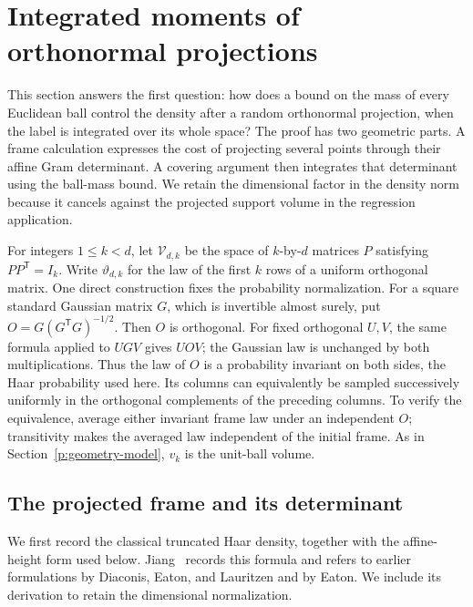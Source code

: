 \section{Integrated moments of orthonormal projections}
\label{p:projection}

This section answers the first question: how does a bound on the mass of
every Euclidean ball control the density after a random orthonormal
projection, when the label is integrated over its whole space? The proof
has two geometric parts. A frame calculation expresses the cost of
projecting several points through their affine Gram determinant. A covering
argument then integrates that determinant using the ball-mass bound.
We retain the dimensional factor in the density norm because it cancels
against the projected support volume in the regression application.

For integers \(1\le k<d\), let \(\mathcal V_{d,k}\) be the space of
\(k\)-by-\(d\) matrices \(P\) satisfying \(PP^{\mathsf T}=I_k\).
Write \(\vartheta_{d,k}\) for the law of the first \(k\) rows of a uniform
orthogonal matrix. One direct construction fixes the probability
normalization. For a square standard Gaussian matrix \(G\), which is
invertible almost surely, put
\(O=G(G^{\mathsf T}G)^{-1/2}\). Then \(O\) is orthogonal. For fixed
orthogonal \(U,V\), the same formula applied to \(UGV\) gives \(UOV\);
the Gaussian law is unchanged by both multiplications. Thus the law of
\(O\) is a probability invariant on both sides, the Haar probability
used here. Its columns can equivalently be sampled successively uniformly
in the orthogonal complements of the preceding columns. To verify the
equivalence, average either invariant frame law under an independent \(O\);
transitivity makes the averaged law independent of the initial frame.
As in Section~\ref{p:geometry-model}, \(v_k\) is the unit-ball volume.

\subsection{The projected frame and its determinant}

We first record the classical truncated Haar density, together with the
affine-height form used below. Jiang~\cite[Lemma~2.5]{Jiang2006} records
this formula and refers to earlier formulations by Diaconis, Eaton, and
Lauritzen and by Eaton. We include its derivation to retain the
dimensional normalization.

